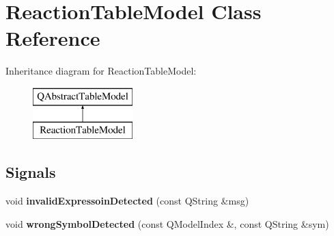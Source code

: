 \hypertarget{class_reaction_table_model}{}\section{Reaction\+Table\+Model Class Reference}
\label{class_reaction_table_model}
Inheritance diagram for Reaction\+Table\+Model\+:\begin{figure}[H]
\begin{center}
\leavevmode
\includegraphics[height=2.000000cm]{class_reaction_table_model}
\end{center}
\end{figure}
\subsection*{Signals}
\begin{DoxyCompactItemize}
\item 
\mbox{\label{class_reaction_table_model_a932ce5eecbd4fdbb3fc2153e2887bb0f}} 
void {\bfseries invalid\+Expressoin\+Detected} (const Q\+String \&msg)
\item 
\mbox{\label{class_reaction_table_model_a684bb949e63733630d74064346bd5789}} 
void {\bfseries wrong\+Symbol\+Detected} (const Q\+Model\+Index \&, const Q\+String \&sym)
\end{DoxyCompactItemize}

